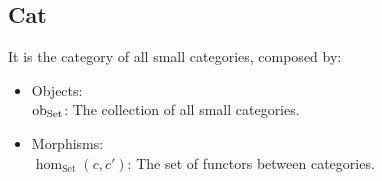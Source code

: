 \subsection{Cat}
\begin{definition}
  It is the category of all small categories, composed by:
  \parencite{adamek_herrlich_strecker:joy_cats}
  \begin{itemize}
    \item Objects:\\
      $\mathrm{ob}_{\mathrm{Set}}$: The collection of all small categories.
    \item Morphisms:\\
      $\hom_{\mathrm{Set}}(c, c')$: The set of functors between categories.
  \end{itemize}
\end{definition}
